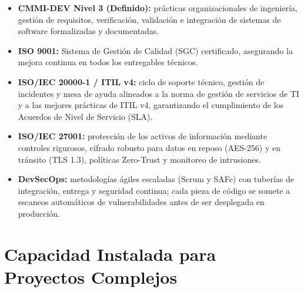 \begin{itemize}
  \item \textbf{CMMI-DEV Nivel 3 (Definido):} prácticas organizacionales de ingeniería,
        gestión de requisitos, verificación, validación e integración de sistemas de
        software formalizadas y documentadas.
  \item \textbf{ISO 9001:} Sistema de Gestión de Calidad (SGC) certificado, asegurando
        la mejora continua en todos los entregables técnicos.
  \item \textbf{ISO/IEC 20000-1 / ITIL v4:} ciclo de soporte técnico, gestión de
        incidentes y mesa de ayuda alineados a la norma de gestión de servicios de TI y
        a las mejores prácticas de ITIL v4, garantizando el cumplimiento de los Acuerdos
        de Nivel de Servicio (SLA).
  \item \textbf{ISO/IEC 27001:} protección de los activos de información mediante
        controles rigurosos, cifrado robusto para datos en reposo (AES-256) y en tránsito
        (TLS 1.3), políticas Zero-Trust y monitoreo de intrusiones.
  \item \textbf{DevSecOps:} metodologías ágiles escaladas (Scrum y SAFe) con tuberías de
        integración, entrega y seguridad continua; cada pieza de código se somete a
        escaneos automáticos de vulnerabilidades antes de ser desplegada en producción.
\end{itemize}

\section{Capacidad Instalada para Proyectos Complejos}

